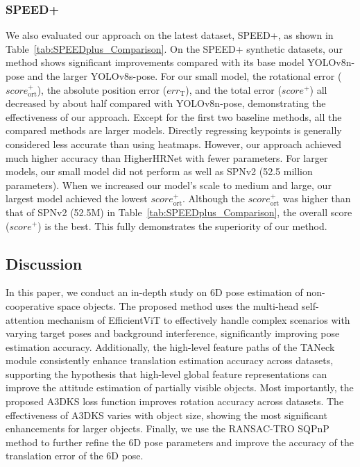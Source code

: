 \documentclass[a4paper,fleqn]{cas-sc}
\begin{document}
\subsubsection{SPEED+}
We also evaluated our approach on the latest dataset, SPEED+, as shown in Table~\ref{tab:SPEEDplus_Comparison}.
On the SPEED+ synthetic datasets, our method shows significant improvements compared with its base model YOLOv8n-pose and the larger YOLOv8s-pose.
For our small model, the rotational error ($score_{\text{ort}}^+$), the absolute position error ($err_{\text{T}}$), and the total error ($score^+$) all decreased by about half compared with YOLOv8n-pose, demonstrating the effectiveness of our approach.
Except for the first two baseline methods, all the compared methods are larger models.
Directly regressing keypoints is generally considered less accurate than using heatmaps.
However, our approach achieved much higher accuracy than HigherHRNet with fewer parameters.
For larger models, our small model did not perform as well as SPNv2 (52.5 million parameters).
When we increased our model's scale to medium and large, our largest model achieved the lowest $score_{\text{ort}}^+$.
Although the $score_{\text{ort}}^+$ was higher than that of SPNv2 (52.5M) in Table~\ref{tab:SPEEDplus_Comparison}, the overall score ($score^+$) is the best.
This fully demonstrates the superiority of our method.





\subsection{Discussion}
In this paper, we conduct an in-depth study on 6D pose estimation of non-cooperative space objects. 
The proposed method uses the multi-head self-attention mechanism of EfficientViT 
to effectively handle complex scenarios with varying target poses and background interference, 
significantly improving pose estimation accuracy. Additionally, the high-level feature paths 
of the TANeck module consistently enhance translation estimation accuracy across datasets, 
supporting the hypothesis that high-level global feature representations can improve the 
attitude estimation of partially visible objects. Most importantly, the proposed A3DKS loss 
function improves rotation accuracy across datasets. The effectiveness of A3DKS varies with 
object size, showing the most significant enhancements for larger objects. Finally, we use 
the RANSAC-TRO SQPnP method to further refine the 6D pose parameters and improve the accuracy 
of the translation error of the 6D pose.
\end{document}
